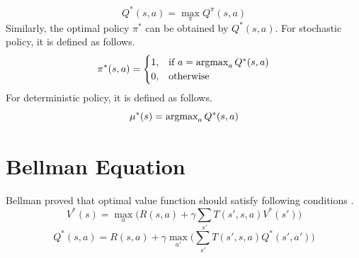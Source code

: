 \begin{equation}
Q^{*}(s,a) = \max_{\pi} Q^{\pi}(s,a)
\end{equation}
Similarly, the optimal policy $\pi^*$ can be obtained by $Q^{*}(s,a)$. For stochastic policy, it is defined as follows. \\
\begin{equation}
\label{eqn:policy_stochastic_q}
\pi^{*}(s,a) = 
\begin{cases}
1,   & \text{if  } a = \operatorname{\textup{argmax}}_{a} Q^{*}(s,a) \\
0,   & \text{otherwise  }
\end{cases} 
\end{equation}
For deterministic policy, it is defined as follows. \\
\begin{equation}
\label{eqn:policy_deterministic_q}
\mu^{*}(s) = \operatorname{\textup{argmax}}_{a} Q^{*}(s,a)
\end{equation}
\section{Bellman Equation}
Bellman proved that optimal value function should satisfy following conditions \cite{bellman_dynamic_2003}. \\
\begin{equation}
\label{eqn:bellman_v}
V^{*}(s) = \max_{a} \big( R(s,a) + \gamma \sum_{s'} T(s',s,a) V^{*}(s') \big)
\end{equation}
\begin{equation}
\label{eqn:bellman_q}
Q^{*}(s,a) = R(s,a) + \gamma \max_{a'} \big( \sum_{s'} T(s',s,a) Q^{*}(s',a') \big)
\end{equation}